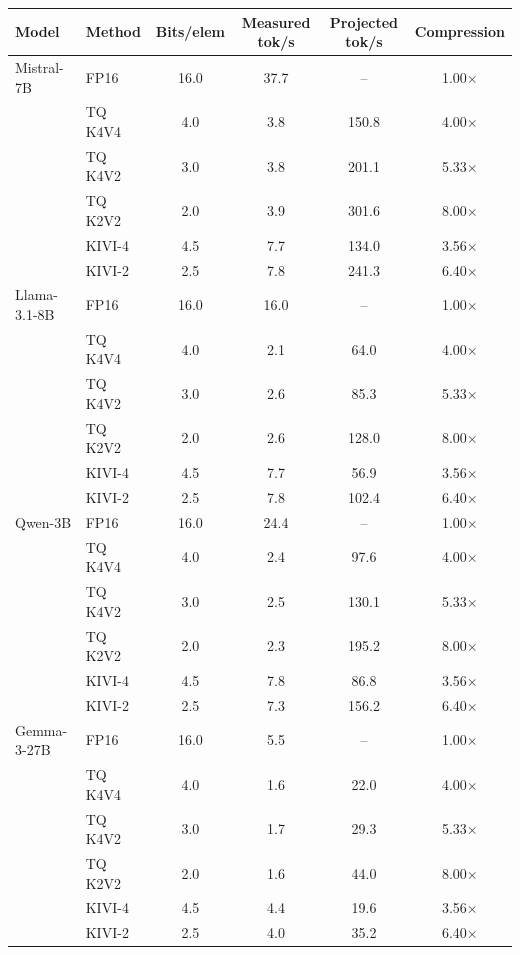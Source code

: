 \begin{tabular}{l l c c c c}
\toprule
Model & Method & Bits/elem & Measured tok/s & Projected tok/s & Compression \\
\midrule
Mistral-7B & FP16 & 16.0 & 37.7 & -- & 1.00$\times$ \\
 & TQ K4V4 & 4.0 & 3.8 & 150.8 & 4.00$\times$ \\
 & TQ K4V2 & 3.0 & 3.8 & 201.1 & 5.33$\times$ \\
 & TQ K2V2 & 2.0 & 3.9 & 301.6 & 8.00$\times$ \\
 & KIVI-4 & 4.5 & 7.7 & 134.0 & 3.56$\times$ \\
 & KIVI-2 & 2.5 & 7.8 & 241.3 & 6.40$\times$ \\
\midrule
Llama-3.1-8B & FP16 & 16.0 & 16.0 & -- & 1.00$\times$ \\
 & TQ K4V4 & 4.0 & 2.1 & 64.0 & 4.00$\times$ \\
 & TQ K4V2 & 3.0 & 2.6 & 85.3 & 5.33$\times$ \\
 & TQ K2V2 & 2.0 & 2.6 & 128.0 & 8.00$\times$ \\
 & KIVI-4 & 4.5 & 7.7 & 56.9 & 3.56$\times$ \\
 & KIVI-2 & 2.5 & 7.8 & 102.4 & 6.40$\times$ \\
\midrule
Qwen-3B & FP16 & 16.0 & 24.4 & -- & 1.00$\times$ \\
 & TQ K4V4 & 4.0 & 2.4 & 97.6 & 4.00$\times$ \\
 & TQ K4V2 & 3.0 & 2.5 & 130.1 & 5.33$\times$ \\
 & TQ K2V2 & 2.0 & 2.3 & 195.2 & 8.00$\times$ \\
 & KIVI-4 & 4.5 & 7.8 & 86.8 & 3.56$\times$ \\
 & KIVI-2 & 2.5 & 7.3 & 156.2 & 6.40$\times$ \\
\midrule
Gemma-3-27B & FP16 & 16.0 & 5.5 & -- & 1.00$\times$ \\
 & TQ K4V4 & 4.0 & 1.6 & 22.0 & 4.00$\times$ \\
 & TQ K4V2 & 3.0 & 1.7 & 29.3 & 5.33$\times$ \\
 & TQ K2V2 & 2.0 & 1.6 & 44.0 & 8.00$\times$ \\
 & KIVI-4 & 4.5 & 4.4 & 19.6 & 3.56$\times$ \\
 & KIVI-2 & 2.5 & 4.0 & 35.2 & 6.40$\times$ \\
\bottomrule
\end{tabular}